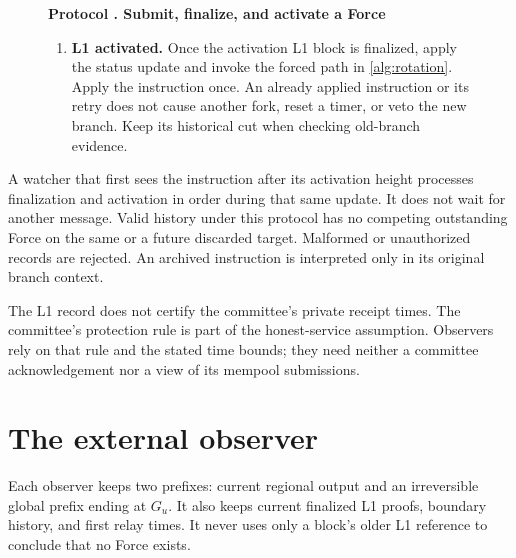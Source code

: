 \documentclass[11pt,a4paper]{article}
\newcounter{protocol}
\newenvironment{protocol}[2]{\begin{figure}[htbp]\refstepcounter{protocol}\label{#1}
\begin{mdframed}[linewidth=.6pt,skipabove=0pt,skipbelow=0pt,
innertopmargin=7pt,innerbottommargin=7pt]\small
\textbf{Protocol \theprotocol. #2}\par\smallskip}{\end{mdframed}\end{figure}}
\begin{document}
\begin{protocol}{alg:force}{Submit, finalize, and activate a Force}
\begin{enumerate}[label=\textbf{\arabic*)},itemsep=3pt]
\item \textbf{L1 activated.} Once the activation L1 block is finalized,
apply the status update and invoke the forced path in \cref{alg:rotation}.
Apply the instruction once. An already applied instruction or its retry
does not cause another fork, reset a timer, or veto the new branch.
Keep its historical cut when checking old-branch evidence.
\end{enumerate}
\end{protocol}

A watcher that first sees the instruction after its activation height
processes finalization and activation in order during that same update.
It does not wait for another message. Valid history under this protocol
has no competing outstanding Force on the same or a future discarded
target. Malformed or unauthorized records are rejected. An archived
instruction is interpreted only in its original branch context.

The L1 record does not certify the committee's private receipt times.
The committee's protection rule is part of the honest-service assumption.
Observers rely on that rule and the stated time bounds; they need neither
a committee acknowledgement nor a view of its mempool submissions.

\section{The external observer}
\label{sec:observers}
Each observer keeps two prefixes: current regional output and an
irreversible global prefix ending at $G_u$. It also keeps current
finalized L1 proofs, boundary history, and first relay times. It never
uses only a block's older L1 reference to conclude that no Force exists.
\end{document}
